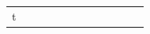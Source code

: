 \documentclass[conference]{IEEEtran}
\begin{document}
\begin{figure}
\begin{center}
\begin{tabular}{| x{1.11cm} | x{.75cm} | x{.75cm} || x{1.11cm} | x{.75cm} | x{.75cm} || x{1.11cm} | x{.75cm} | x{.75cm} || x{1.11cm} | x{.75cm} | x{.75cm} |}
t
\end{tabular}
\end{center}
\end{figure}
\end{document}
